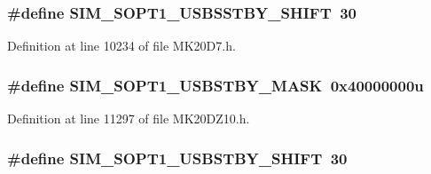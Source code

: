 \subsubsection[{\texorpdfstring{S\+I\+M\+\_\+\+S\+O\+P\+T1\+\_\+\+U\+S\+B\+S\+S\+T\+B\+Y\+\_\+\+S\+H\+I\+FT}{SIM_SOPT1_USBSSTBY_SHIFT}}]{\setlength{\rightskip}{0pt plus 5cm}\#define S\+I\+M\+\_\+\+S\+O\+P\+T1\+\_\+\+U\+S\+B\+S\+S\+T\+B\+Y\+\_\+\+S\+H\+I\+FT~30}\hypertarget{group___s_i_m___register___masks_ga8a24334d1be5bd01017bd364dd53f268}{}\label{group___s_i_m___register___masks_ga8a24334d1be5bd01017bd364dd53f268}


Definition at line 10234 of file M\+K20\+D7.\+h.

\subsubsection[{\texorpdfstring{S\+I\+M\+\_\+\+S\+O\+P\+T1\+\_\+\+U\+S\+B\+S\+T\+B\+Y\+\_\+\+M\+A\+SK}{SIM_SOPT1_USBSTBY_MASK}}]{\setlength{\rightskip}{0pt plus 5cm}\#define S\+I\+M\+\_\+\+S\+O\+P\+T1\+\_\+\+U\+S\+B\+S\+T\+B\+Y\+\_\+\+M\+A\+SK~0x40000000u}\hypertarget{group___s_i_m___register___masks_ga9f67cf8d4a03796048990563ac60a627}{}\label{group___s_i_m___register___masks_ga9f67cf8d4a03796048990563ac60a627}


Definition at line 11297 of file M\+K20\+D\+Z10.\+h.

\subsubsection[{\texorpdfstring{S\+I\+M\+\_\+\+S\+O\+P\+T1\+\_\+\+U\+S\+B\+S\+T\+B\+Y\+\_\+\+S\+H\+I\+FT}{SIM_SOPT1_USBSTBY_SHIFT}}]{\setlength{\rightskip}{0pt plus 5cm}\#define S\+I\+M\+\_\+\+S\+O\+P\+T1\+\_\+\+U\+S\+B\+S\+T\+B\+Y\+\_\+\+S\+H\+I\+FT~30}\hypertarget{group___s_i_m___register___masks_ga26f72c75602df2d86c877038d60dcc73}{}\label{group___s_i_m___register___masks_ga26f72c75602df2d86c877038d60dcc73}


